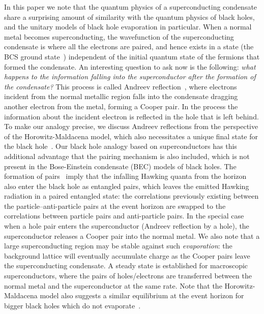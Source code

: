 \documentclass[10pt,letterpaper,aps,onecolumn,superscriptaddress,floatfix,notitlepage]{revtex4-1}
\begin{document}
	In this paper we note that the quantum physics of a superconducting condensate share a surprising amount of similarity with the quantum physics of black holes, and the unitary models of black hole evaporation in particular. When a normal metal becomes superconducting, the wavefunction of the superconducting condensate is where all the electrons are paired, and hence exists in a state (the BCS ground state~\cite{BCS}) independent of the initial quantum state of the fermions that formed the condensate. An interesting question to ask now is the following: \textit{what happens to the information falling into the superconductor after the formation of the condensate?} This process is called Andreev reflection~\cite{andreev,Pannet,spintron,artemenko1978excess,artemenko1979theory,artemenko1979excess,zaitsev1980theory}, where electrons incident from the normal metallic region falls into the condensate dragging another electron from the metal, forming a Cooper pair. In the process the information about the incident electron is reflected in the hole that is left behind. To make our analogy precise, we discuss Andreev reflections from the perspective of the Horowitz-Maldacena model, which also necessitates a unique final state for the black hole~\cite{horowitz,projection}. Our black hole analogy based on superconductors has this additional advantage that the pairing mechanism is also included, which is not present in the Bose-Einstein condensate (BEC) models of black holes. The formation of pairs~\cite{horowitz,projection} imply that the infalling Hawking quanta from the horizon also enter the black hole as entangled pairs, which leaves the emitted Hawking radiation in a paired entangled state: the correlations previously existing between the particle--anti-particle pairs at the event horizon are swapped to the correlations between particle pairs and anti-particle pairs. In the special case when a hole pair enters the superconductor (Andreev reflection by a hole), the superconductor releases a Cooper pair into the normal metal. We also note that a large superconducting region may be stable against such \textit{evaporation}: the background lattice will eventually accumulate charge as the Cooper pairs leave the superconducting condensate. A steady state is established for macroscopic superconductors, where the pairs of holes/electrons are transferred between the normal metal and the superconductor at the same rate. Note that the Horowitz-Maldacena model also suggests a similar equilibrium at the event horizon for bigger black holes which do not evaporate~\cite{horowitz}.        
	
\end{document}
